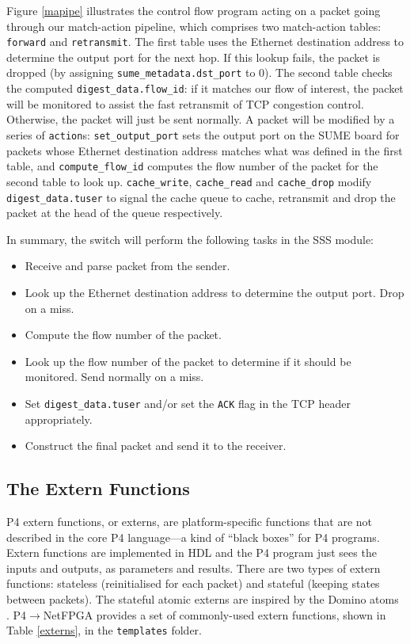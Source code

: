 Figure \ref{mapipe} illustrates the control flow program acting on a packet going through our match-action pipeline, which comprises two match-action tables: \texttt{forward} and \texttt{retransmit}.
The first table uses the Ethernet destination address to determine the output port for the next hop. If this lookup fails, the packet is dropped (by assigning \texttt{sume\_metadata.dst\_port} to 0). The second table checks the computed \texttt{digest\_data.flow\_id}: if it matches our flow of interest, the packet will be monitored to assist the fast retransmit of TCP congestion control. Otherwise, the packet will just be sent normally. A packet will be modified by a series of \texttt{action}s: \texttt{set\_output\_port} sets the output port on the SUME board for packets whose Ethernet destination address matches what was defined in the first table, and \texttt{compute\_flow\_id} computes the flow number of the packet for the second table to look up. \texttt{cache\_write}, \texttt{cache\_read} and \texttt{cache\_drop} modify \texttt{digest\_data.tuser} to signal the cache queue to cache, retransmit and drop the packet at the head of the queue respectively.

In summary, the switch will perform the following tasks in the SSS module:
\begin{itemize}
	\item Receive and parse packet from the sender.
	\item Look up the Ethernet destination address to determine the output port. Drop on a miss.
	\item Compute the flow number of the packet.
	\item Look up the flow number of the packet to determine if it should be monitored. Send normally on a miss.
	\item Set \texttt{digest\_data.tuser} and/or set the \texttt{ACK} flag in the TCP header appropriately.
	\item Construct the final packet and send it to the receiver.
\end{itemize}

	\subsection{The Extern Functions}
P4 extern functions, or externs, are platform-specific functions that are not described in the core P4 language---a kind of ``black boxes'' for P4 programs. Extern functions are implemented in HDL and the P4 program just sees the inputs and outputs, as parameters and results. There are two types of extern functions: stateless (reinitialised for each packet) and stateful (keeping states between packets). The stateful atomic externs are inspired by the Domino atoms \cite{domino}. P4$\rightarrow$NetFPGA provides a set of commonly-used extern functions, shown in Table \ref{externs}, in the \texttt{templates} folder. 

